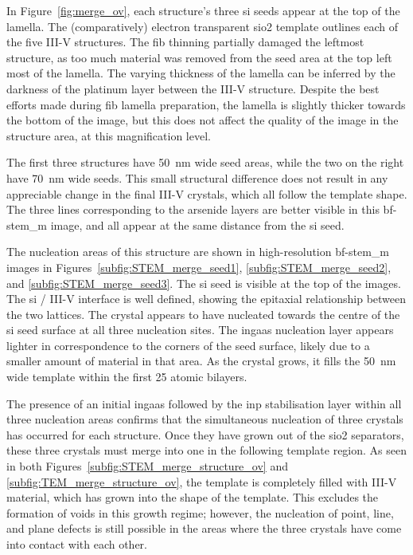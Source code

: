 In Figure~\ref{fig:merge_ov}, each structure's three \acl{si} seeds appear at the top of the lamella. The (comparatively) electron transparent \acs{sio2} template outlines each of the five III-V structures. The \acs{fib} thinning partially damaged the leftmost structure, as too much material was removed from the seed area at the top left most of the lamella. The varying thickness of the lamella can be inferred by the darkness of the platinum layer between the III-V structure. Despite the best efforts made during \acs{fib} lamella preparation, the lamella is slightly thicker towards the bottom of the image, but this does not affect the quality of the image in the structure area, at this magnification level.

The first three structures have \qty{50}{\nano\metre} wide seed areas, while the two on the right have \qty{70}{\nano\metre} wide seeds. This small structural difference does not result in any appreciable change in the final III-V crystals, which all follow the template shape. The three lines corresponding to the arsenide layers are better visible in this \acs{bf}-\acs{stem_m} image, and all appear at the same distance from the \acl{si} seed.

The nucleation areas of this structure are shown in high-resolution \acs{bf}-\acs{stem_m} images in Figures~\ref{subfig:STEM_merge_seed1}, \ref{subfig:STEM_merge_seed2}, and \ref{subfig:STEM_merge_seed3}. The \acl{si} seed is visible at the top of the images. The \acs{si} / III-V interface is well defined, showing the epitaxial relationship between the two lattices. The crystal appears to have nucleated towards the centre of the \acl{si} seed surface at all three nucleation sites. The \acs{ingaas} nucleation layer appears lighter in correspondence to the corners of the seed surface, likely due to a smaller amount of material in that area. As the crystal grows, it fills the \qty{50}{\nano\metre} wide template within the first 25 atomic bilayers.

The presence of an initial \acs{ingaas} followed by the \acs{inp} stabilisation layer within all three nucleation areas confirms that the simultaneous nucleation of three crystals has occurred for each structure. Once they have grown out of the \acs{sio2} separators, these three crystals must merge into one in the following template region. As seen in both Figures~\ref{subfig:STEM_merge_structure_ov} and \ref{subfig:TEM_merge_structure_ov}, the template is completely filled with III-V material, which has grown into the shape of the template. This excludes the formation of voids in this growth regime; however, the nucleation of point, line, and plane defects is still possible in the areas where the three crystals have come into contact with each other. 

